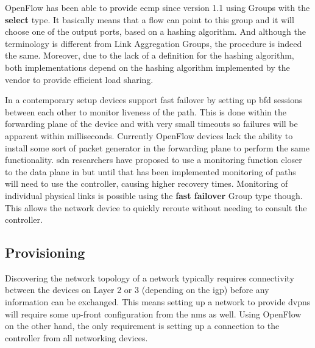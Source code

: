 OpenFlow has been able to provide \ac{ecmp} since version 1.1 using Groups with the \textbf{select} type. It basically means that a flow can point to this group and it will choose one of the output ports, based on a hashing algorithm. And although the terminology is different from Link Aggregation Groups, the procedure is indeed the same. Moreover, due to the lack of a definition for the hashing algorithm, both implementations depend on the hashing algorithm implemented by the vendor to provide efficient load sharing.

In a contemporary setup devices support fast failover by setting up \ac{bfd} sessions between each other to monitor liveness of the path. This is done within the forwarding plane of the device and with very small timeouts so failures will be apparent within milliseconds. Currently OpenFlow devices lack the ability to install some sort of packet generator in the forwarding plane to perform the same functionality. \ac{sdn} researchers have proposed to use a monitoring function closer to the data plane in \cite{scalable-fault} but until that has been implemented monitoring of paths will need to use the controller, causing higher recovery times. Monitoring of individual physical links is possible using the \textbf{fast failover} Group type though. This allows the network device to quickly reroute without needing to consult the controller.





\subsection{Provisioning} %
\label{sub:provisioning}

Discovering the network topology of a network typically requires connectivity between the devices on Layer 2 or 3 (depending on the \ac{igp}) before any information can be exchanged. This means setting up a network to provide \acp{dvpn} will require some up-front configuration from the \ac{nms} as well. Using OpenFlow on the other hand, the only requirement is setting up a connection to the controller from all networking devices. 

